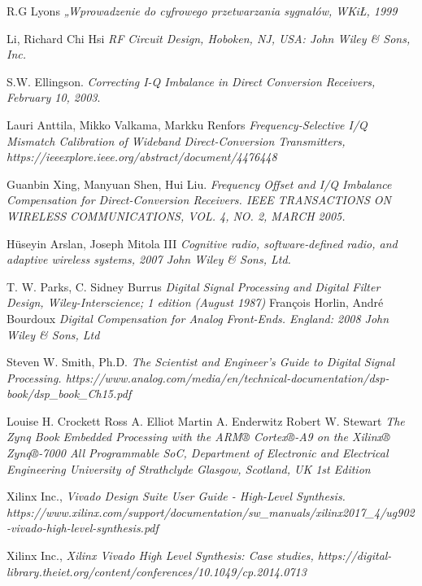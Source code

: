 \documentclass[en,printmode]{mgr}
\begin{document}
\begin{thebibliography}{9}
R.G Lyons
\textit{„Wprowadzenie do cyfrowego przetwarzania sygnałów, WKiŁ, 1999}

Li, Richard Chi Hsi
\textit{RF Circuit Design, Hoboken, NJ, USA: John Wiley \& Sons, Inc.}

S.W. Ellingson. 
\textit{Correcting I-Q Imbalance in Direct Conversion
Receivers, February 10, 2003}.

Lauri Anttila,
Mikko Valkama,
Markku Renfors
\textit{Frequency-Selective I/Q Mismatch Calibration of Wideband Direct-Conversion Transmitters, https://ieeexplore.ieee.org/abstract/document/4476448}

Guanbin Xing, Manyuan Shen, Hui Liu.
\textit{Frequency Offset and I/Q Imbalance Compensation for Direct-Conversion Receivers. IEEE TRANSACTIONS ON WIRELESS COMMUNICATIONS, VOL. 4, NO. 2, MARCH 2005.}

Hüseyin Arslan, Joseph Mitola III
\textit{Cognitive radio, software‐defined radio, and adaptive wireless systems, 2007 John Wiley \& Sons, Ltd.}

T. W. Parks,
C. Sidney Burrus
\textit{Digital Signal Processing and
Digital Filter Design, Wiley-Interscience; 1 edition (August 1987)}
François Horlin, André Bourdoux
\textit{Digital Compensation for
Analog Front-Ends. England: 2008 John Wiley \& Sons, Ltd}


Steven W. Smith, Ph.D.
\textit{The Scientist and Engineer's Guide to
Digital Signal Processing. https://www.analog.com/media/en/technical-documentation/dsp-book/dsp_book_Ch15.pdf}

Louise H. Crockett
Ross A. Elliot
Martin A. Enderwitz
Robert W. Stewart
\textit{The Zynq Book Embedded Processing with the ARM® Cortex®-A9 on the Xilinx®
Zynq®-7000 All Programmable SoC, Department of Electronic and Electrical Engineering
University of Strathclyde
Glasgow, Scotland, UK
1st Edition}

Xilinx Inc.,
\textit{Vivado Design Suite User Guide - High-Level Synthesis. https://www.xilinx.com/support/documentation/sw_manuals/xilinx2017_4/ug902-vivado-high-level-synthesis.pdf}

Xilinx Inc.,
\textit{Xilinx Vivado High Level Synthesis: Case studies, https://digital-library.theiet.org/content/conferences/10.1049/cp.2014.0713}


\end{thebibliography}
\end{document}
